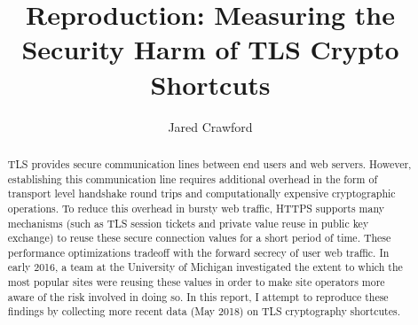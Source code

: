 \documentclass[sigconf]{acmart}
\begin{document}
\title{Reproduction: Measuring the Security Harm of TLS Crypto Shortcuts}


\author{Jared Crawford}

\renewcommand{\shortauthors}{X.et al.}

\begin{abstract}
    TLS provides secure communication lines between end users and web servers. However, establishing this communication line requires additional overhead in the form of transport level handshake round trips and computationally expensive cryptographic operations. To reduce this overhead in bursty web traffic, HTTPS supports many mechanisms (such as TLS session tickets and private value reuse in public key exchange) to reuse these secure connection values for a short period of time. These performance optimizations tradeoff with the forward secrecy of user web traffic. In early 2016, a team at the University of Michigan investigated the extent to which the most popular sites were reusing these values in order to make site operators more aware of the risk involved in doing so\cite{Springall:2016:MSH:2987443.2987480}. In this report, I attempt to reproduce these findings by collecting more recent data (May 2018) on TLS cryptography shortcutes.
\end{abstract}

\maketitle





\end{document}
